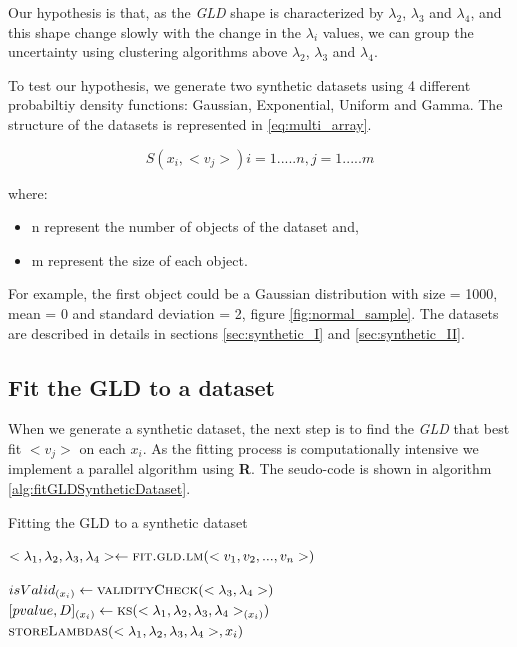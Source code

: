 Our hypothesis is that, as the \textit{GLD} shape is characterized by $\lambda_{2}$, $\lambda_{3}$ and $\lambda_{4}$, and this shape change slowly with the change in the $\lambda_{i}$  values, we can group the uncertainty using clustering algorithms above $\lambda_{2}$, $\lambda_{3}$ and $\lambda_{4}$.  

To test our hypothesis, we generate two synthetic datasets using 4 different probabiltiy density functions: Gaussian, Exponential, Uniform and Gamma. The structure of the datasets is represented in \ref{eq:multi_array}.  

\begin{equation}\label{eq:multi_array}
S(x_{i}, <v_{j}>) i=1.....n,j=1.....m
\end{equation}

where:
\begin{itemize}
\item n represent the number of objects of the dataset and,
\item m represent the size of each object.
\end{itemize}

For example, the first object could be a Gaussian distribution with size = 1000, mean = 0 and standard deviation = 2, figure \ref{fig:normal_sample}. The datasets are described in details in sections \ref{sec:synthetic_I} and \ref{sec:synthetic_II}. 


\subsection{Fit the GLD to a dataset}\label{sub:fitting_gld}
When we generate a synthetic dataset, the next step is to find the \textit{GLD} that best fit $<v_{j}>$ on each $x_{i}$. As the fitting process is computationally intensive we implement a parallel algorithm using \textbf{R}. The seudo-code is shown in algorithm \ref{alg:fitGLDSyntheticDataset}.

\begin{algorithm} 
\caption{Fitting the GLD to a synthetic dataset}\label{alg:fitGLDSyntheticDataset}
\begin{algorithmic}[1] 
\State $<\lambda_{1},\lambda_{2},\lambda_{3},\lambda_{4}> \gets \Call {fit.gld.lm}{<v_1,v_2,...,v_{n}>}$

\State $isValid_{(x_{i})} \gets \Call {validityCheck}{<\lambda_{3},\lambda_{4}>}$
\State $[pvalue,D]_{(x_{i})} \gets \Call{ks}{<\lambda_{1},\lambda_{2},\lambda_{3},\lambda_{4}>_{(x_{i})}}$
\EndIf
{}
\State $\Call{storeLambdas}{<\lambda_{1},\lambda_{2},\lambda_{3},\lambda_{4}>,x_{i}}$
\EndIf
\EndFunction 
\end{algorithmic} 
\end{algorithm} 

